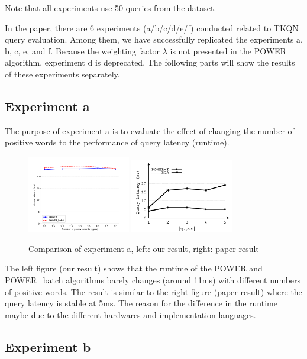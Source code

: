 \documentclass[]{IEEEphot}
\begin{document}
Note that all experiments use 50 queries from the dataset.

In the paper, there are 6 experiments (a/b/c/d/e/f) conducted related to TKQN query evaluation. Among them, we have successfully replicated the experiments a, b, c, e, and f. Because the weighting factor $\lambda$ is not presented in the POWER algorithm, experiment d is deprecated. The following parts will show the results of these experiments separately.

\subsection{Experiment a}

The purpose of experiment a is to evaluate the effect of changing the number of positive words to the performance of query latency (runtime).

\begin{figure}[h]
    \centering
    \includegraphics[width=0.4\textwidth]{../exp_plots/a_4m_50queries_20250314-212142.png}
    \includegraphics[width=0.4\textwidth]{./pics/paper-exp-a.png}
    \caption{Comparison of experiment a, left: our result, right: paper result}
\end{figure}

The left figure (our result) shows that the runtime of the POWER and POWER\_batch algorithms barely changes (around 11ms) with different numbers of positive words. The result is similar to the right figure (paper result) where the query latency is stable at 5ms. The reason for the difference in the runtime maybe due to the different hardwares and implementation languages.

\subsection{Experiment b}
\end{document}
